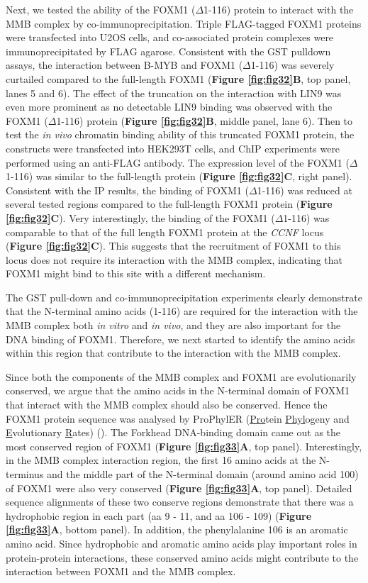 Next, we tested the ability of the FOXM1 ($\Delta$1-116) protein to interact with the MMB complex by co-immunoprecipitation. Triple FLAG-tagged FOXM1 proteins were transfected into U2OS cells, and co-associated protein complexes were immunoprecipitated by FLAG agarose. Consistent with the GST pulldown assays, the interaction between B-MYB and FOXM1 ($\Delta$1-116) was severely curtailed compared to the full-length FOXM1 (\textbf{Figure \ref{fig:fig32}B}, top panel, lanes 5 and 6). The effect of the truncation on the interaction with LIN9 was even more prominent as no detectable LIN9 binding was observed with the FOXM1 ($\Delta$1-116) protein (\textbf{Figure \ref{fig:fig32}B}, middle panel, lane 6). Then to test the \textit{in vivo} chromatin binding ability of this truncated FOXM1 protein, the constructs were transfected into HEK293T cells, and ChIP experiments were performed using an anti-FLAG antibody. The expression level of the FOXM1 ($\Delta$1-116) was similar to the full-length protein (\textbf{Figure \ref{fig:fig32}C}, right panel). Consistent with the IP results, the binding of FOXM1 ($\Delta$1-116) was reduced at several tested regions compared to the full-length FOXM1 protein (\textbf{Figure \ref{fig:fig32}C}). Very interestingly, the binding of the FOXM1 ($\Delta$1-116) was comparable to that of the full length FOXM1 protein at the \textit{CCNF} locus (\textbf{Figure \ref{fig:fig32}C}). This suggests that the recruitment of FOXM1 to this locus does not require its interaction with the MMB complex, indicating that FOXM1 might bind to this site with a different mechanism.

The GST pull-down and co-immunoprecipitation experiments clearly demonstrate that the N-terminal amino acids (1-116) are required for the interaction with the MMB complex both \textit{in vitro} and \textit{in vivo}, and they are also important for the DNA binding of FOXM1. Therefore, we next started to identify the amino acids within this region that contribute to the interaction with the MMB complex.

Since both the components of the MMB complex and FOXM1 are evolutionarily conserved, we argue that the amino acids in the N-terminal domain of FOXM1 that interact with the MMB complex should also be conserved. Hence the FOXM1 protein sequence was analysed by ProPhylER (\underline{Pro}tein \underline{Phyl}ogeny and \underline{E}volutionary \underline{R}ates) (\cite{binkley2010prophyler:}). The Forkhead DNA-binding domain came out as the most conserved region of FOXM1 (\textbf{Figure \ref{fig:fig33}A}, top panel). Interestingly, in the MMB complex interaction region, the first 16 amino acids at the N-terminus and the middle part of the N-terminal domain (around amino acid 100) of FOXM1 were also very conserved (\textbf{Figure \ref{fig:fig33}A}, top panel). Detailed sequence alignments of these two conserve regions demonstrate that there was a hydrophobic region in each part (aa 9 - 11, and aa 106 - 109) (\textbf{Figure \ref{fig:fig33}A}, bottom panel). In addition, the phenylalanine 106 is an aromatic amino acid. Since hydrophobic and aromatic amino acids play important roles in protein-protein interactions, these conserved amino acids might contribute to the interaction between FOXM1 and the MMB complex.

